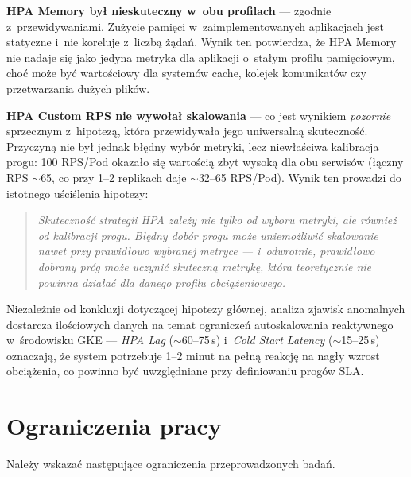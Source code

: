 \textbf{HPA Memory był nieskuteczny w~obu profilach} — zgodnie z~przewidywaniami. Zużycie pamięci w~zaimplementowanych aplikacjach jest statyczne i~nie koreluje z~liczbą żądań. Wynik ten potwierdza, że HPA Memory nie nadaje się jako jedyna metryka dla aplikacji o~stałym profilu pamięciowym, choć może być wartościowy dla systemów cache, kolejek komunikatów czy przetwarzania dużych plików.

\textbf{HPA Custom RPS nie wywołał skalowania} — co jest wynikiem \textit{pozornie} sprzecznym z~hipotezą, która przewidywała jego uniwersalną skuteczność. Przyczyną nie był jednak błędny wybór metryki, lecz niewłaściwa kalibracja progu: 100 RPS/Pod okazało się wartością zbyt wysoką dla obu serwisów (łączny RPS $\sim$65, co przy 1--2 replikach daje $\sim$32--65 RPS/Pod). Wynik ten prowadzi do istotnego uściślenia hipotezy:

\begin{quote}
\textit{Skuteczność strategii HPA zależy nie tylko od wyboru metryki, ale również od kalibracji progu. Błędny dobór progu może uniemożliwić skalowanie nawet przy prawidłowo wybranej metryce — i~odwrotnie, prawidłowo dobrany próg może uczynić skuteczną metrykę, która teoretycznie nie powinna działać dla danego profilu obciążeniowego.}
\end{quote}

Niezależnie od konkluzji dotyczącej hipotezy głównej, analiza zjawisk anomalnych dostarcza ilościowych danych na temat ograniczeń autoskalowania reaktywnego w~środowisku GKE — \textit{HPA Lag} ($\sim$60--75\,s) i~\textit{Cold Start Latency} ($\sim$15--25\,s) oznaczają, że system potrzebuje 1--2 minut na pełną reakcję na nagły wzrost obciążenia, co powinno być uwzględniane przy definiowaniu progów SLA.

\section{Ograniczenia pracy}

Należy wskazać następujące ograniczenia przeprowadzonych badań.

